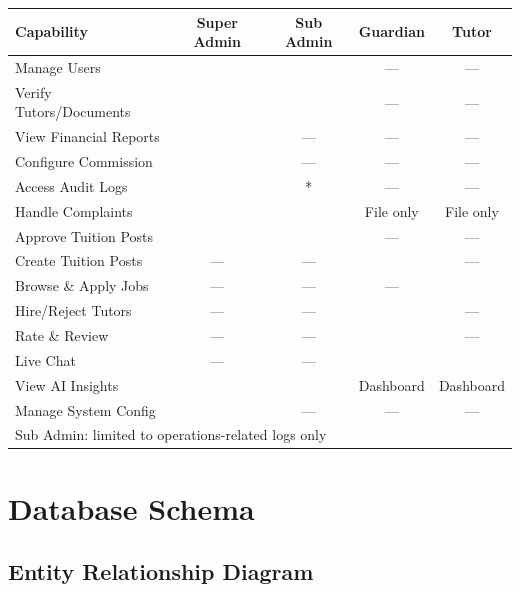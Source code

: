 \documentclass[12pt,a4paper,twoside]{report}
\newcommand{\checkmark}{\ding{51}}
\begin{document}
\begin{longtable}{p{4cm}|c|c|c|c}
\toprule
\textbf{Capability} & \textbf{Super Admin} & \textbf{Sub Admin} & \textbf{Guardian} & \textbf{Tutor} \\
\midrule
\endhead
\bottomrule
\endfoot
Manage Users             & \checkmark & \checkmark & --- & --- \\
Verify Tutors/Documents  & \checkmark & \checkmark & --- & --- \\
View Financial Reports   & \checkmark & --- & --- & --- \\
Configure Commission     & \checkmark & --- & --- & --- \\
Access Audit Logs        & \checkmark & \checkmark* & --- & --- \\
Handle Complaints        & \checkmark & \checkmark & File only & File only \\
Approve Tuition Posts    & \checkmark & \checkmark & --- & --- \\
Create Tuition Posts     & --- & --- & \checkmark & --- \\
Browse \& Apply Jobs     & --- & --- & --- & \checkmark \\
Hire/Reject Tutors       & --- & --- & \checkmark & --- \\
Rate \& Review           & --- & --- & \checkmark & --- \\
Live Chat                & --- & --- & \checkmark & \checkmark \\
View AI Insights         & \checkmark & \checkmark & Dashboard & Dashboard \\
Manage System Config     & \checkmark & --- & --- & --- \\
\bottomrule
\multicolumn{5}{l}{\tiny* Sub Admin: limited to operations-related logs only} \\
\end{longtable}

\chapter{Database Schema}

\section{Entity Relationship Diagram}
\end{document}
